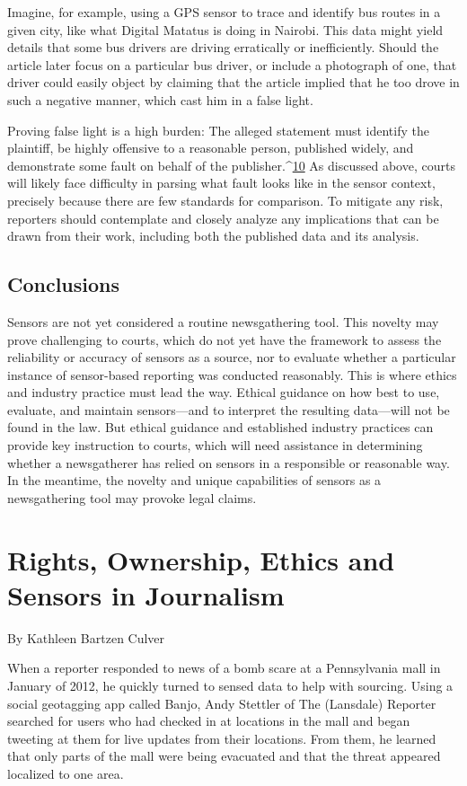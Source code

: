 Imagine, for example, using a GPS sensor to trace and identify bus routes in
a given city, like what Digital Matatus is doing in Nairobi. This data might
yield details that some bus drivers are driving erratically or inefficiently.
Should the article later focus on a particular bus driver, or include a photograph
of one, that driver could easily object by claiming that the article
implied that he too drove in such a negative manner, which cast him in a
false light.

Proving false light is a high burden: The alleged statement must identify the
plaintiff, be highly offensive to a reasonable person, published widely, and
demonstrate some fault on behalf of the publisher.^{\href{#endnotes-syed}{10}} As discussed above,
courts will likely face difficulty in parsing what fault looks like in the sensor
context, precisely because there are few standards for comparison. To mitigate
any risk, reporters should contemplate and closely analyze any implications
that can be drawn from their work, including both the published data
and its analysis.

\section{Conclusions}
Sensors are not yet considered a routine newsgathering tool. This novelty
may prove challenging to courts, which do not yet have the framework
to assess the reliability or accuracy of sensors as a source, nor to evaluate
whether a particular instance of sensor-based reporting was conducted
reasonably. This is where ethics and industry practice must lead the way.
Ethical guidance on how best to use, evaluate, and maintain sensors—and
to interpret the resulting data—will not be found in the law. But ethical
guidance and established industry practices can provide key instruction to
courts, which will need assistance in determining whether a newsgatherer
has relied on sensors in a responsible or reasonable way. In the meantime,
the novelty and unique capabilities of sensors as a newsgathering tool may
provoke legal claims.

\chapter{Rights, Ownership, Ethics and Sensors in Journalism}
By Kathleen Bartzen Culver

When a reporter responded to news of a bomb scare at a Pennsylvania mall
in January of 2012, he quickly turned to sensed data to help with sourcing.
Using a social geotagging app called Banjo, Andy Stettler of The (Lansdale)
Reporter searched for users who had checked in at locations in the mall and
began tweeting at them for live updates from their locations. From them, he
learned that only parts of the mall were being evacuated and that the threat
appeared localized to one area.

